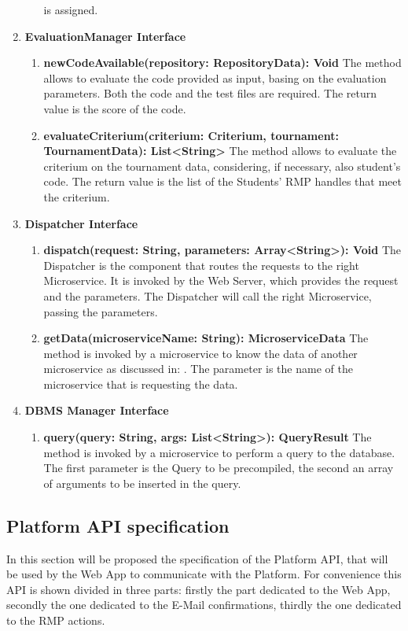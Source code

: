 \begin{enumerate}
\begin{enumerate}[label=$\bullet$]
            is assigned.
        \end{enumerate}
    \item \textbf{EvaluationManager Interface}
        \begin{enumerate}[label=$\bullet$]
            \item \textbf{newCodeAvailable(repository: RepositoryData): Void} The method allows to evaluate the code provided as input, basing on the evaluation parameters. Both the code and the test files are
            required. The return value is the score of the code.
            \item \textbf{evaluateCriterium(criterium: Criterium, tournament: TournamentData): List<String>} The method allows to evaluate the criterium on the tournament data, considering, if necessary, also student's code. The return value is the list of the Students' RMP handles that meet the criterium.
        \end{enumerate}
    \item \textbf{Dispatcher Interface}
        \begin{enumerate}[label=$\bullet$]
            \item \textbf{dispatch(request: String, parameters: Array<String>): Void} The Dispatcher is the component that routes the requests to the right Microservice. It is invoked by the Web Server, which provides the request and the 
            parameters. The Dispatcher will call the right Microservice, passing the parameters.
            \item \textbf{getData(microserviceName: String): MicroserviceData} \label{meth:dispGetData}The method is invoked by a microservice to know the data of another microservice as discussed in: . The parameter is the name of the microservice that is requesting the data.
        \end{enumerate}
    \item \textbf{DBMS Manager Interface}
        \begin{enumerate} [label=$\bullet$]
            \item \textbf{query(query: String, args: List<String>): QueryResult} The method is invoked by a microservice to perform a query to the database. The first parameter is the Query to be precompiled, the second an array of arguments to be inserted in the query.
    \end{enumerate}
\end{enumerate}
\subsection{Platform API specification}
In this section will be proposed the specification of the Platform API, that will be used by the Web App to communicate with the Platform.
For convenience this API is shown divided in three parts: firstly the part dedicated to the Web App, secondly the one dedicated to the E-Mail confirmations, thirdly the one dedicated to the RMP actions.

